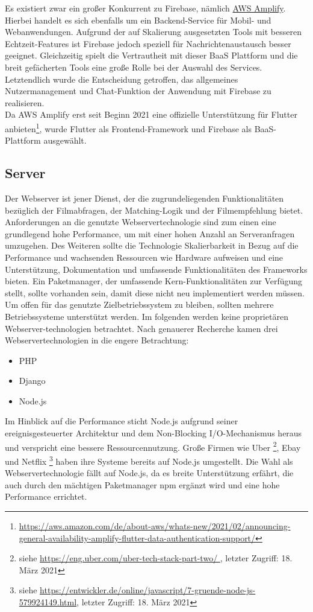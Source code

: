 Es existiert zwar ein großer Konkurrent zu Firebase, nämlich \href{https://docs.amplify.aws/}{AWS Amplify}.
Hierbei handelt es sich ebenfalls um ein Backend-Service für Mobil- und Webanwendungen. 
Aufgrund der auf Skalierung ausgesetzten Tools mit besseren Echtzeit-Features ist Firebase jedoch speziell für Nachrichtenaustausch besser geeignet.
Gleichzeitig spielt die Vertrautheit mit dieser BaaS Plattform und die breit gefächerten Tools eine große Rolle bei der Auswahl des Services.
Letztendlich wurde die Entscheidung getroffen, das allgemeines Nutzermanagement und Chat-Funktion der Anwendung mit Firebase zu realisieren.\\
Da AWS Amplify erst seit Beginn 2021 eine offizielle Unterstützung für Flutter anbieten\footnote{\url{https://aws.amazon.com/de/about-aws/whats-new/2021/02/announcing-general-availability-amplify-flutter-data-authentication-support/}}, wurde Flutter als Frontend-Framework und Firebase als BaaS-Plattform ausgewählt.

\subsection{Server}
\label{sec:server}
Der Webserver ist jener Dienst,  der die zugrundeliegenden Funktionalitäten bezüglich der Filmabfragen, der Matching-Logik und der Filmempfehlung bietet. 
Anforderungen an die genutzte Webservertechnologie sind zum einen eine grundlegend hohe Performance, um mit einer hohen Anzahl an Serveranfragen umzugehen. Des Weiteren sollte die Technologie Skalierbarkeit in Bezug auf die Performance und wachsenden Ressourcen wie Hardware aufweisen und eine Unterstützung, Dokumentation und umfassende Funktionalitäten des Frameworks bieten. 
Ein Paketmanager, der umfassende Kern-Funktionalitäten zur Verfügung stellt, sollte vorhanden sein, damit diese nicht neu implementiert werden müssen. Um offen für das genutzte Zielbetriebssystem zu bleiben, sollten mehrere Betriebssysteme unterstützt werden. 
Im folgenden werden keine proprietären Webserver-technologien betrachtet.
\newline
Nach genauerer Recherche kamen drei Webservertechnologien in die engere Betrachtung:

\begin{itemize}
	\item PHP
	\item Django
	\item Node.js
\end{itemize} 

\noindent
Im Hinblick auf die Performance sticht Node.js aufgrund seiner ereignisgesteuerter Architektur  und dem Non-Blocking I/O-Mechanismus heraus und verspricht eine bessere Ressourcennutzung. 
\newline
Große Firmen wie Uber \footnote{siehe \url{https://eng.uber.com/uber-tech-stack-part-two/ }, letzter Zugriff: 18. März 2021}, Ebay und Netflix \footnote{siehe \url{https://entwickler.de/online/javascript/7-gruende-node-js-579924149.html}, letzter Zugriff: 18. März 2021 } haben ihre Systeme bereits auf Node.js umgestellt. Die Wahl als Webservertechnologie fällt auf Node.js, da es breite Unterstützung erfährt, die auch durch den mächtigen Paketmanager npm ergänzt wird und eine hohe Performance errichtet.


